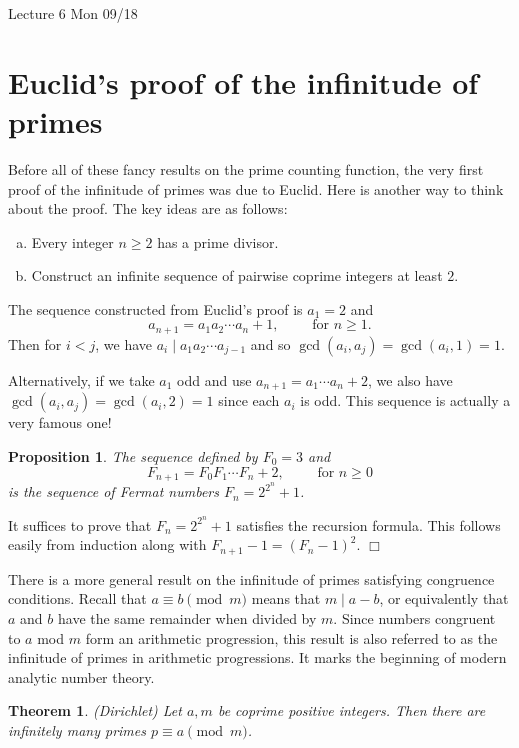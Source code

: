 \documentclass{article}
\newtheorem{theorem}[subsection]{Theorem}
\newtheorem{proposition}[subsection]{Proposition}
\newenvironment{proof}{\noindent {\bf Proof:}}{$\Box$ \vspace{2 ex}}
\newcommand{\add}[1]{{\color{blue} #1}}
\begin{document}
\begin{center}
    \add{Lecture 6 Mon 09/18}
\end{center}
\section{Euclid's proof of the infinitude of primes}

Before all of these fancy results on the prime counting function, the very first proof of the infinitude of primes was due to Euclid. Here is another way to think about the proof. The key ideas are as follows:
\begin{enumerate}[(a)]
    \item Every integer $n\geq 2$ has a prime divisor.
    \item Construct an infinite sequence of pairwise coprime integers at least $2$.
\end{enumerate}
The sequence constructed from Euclid's proof is $a_1 = 2$ and 
$$a_{n+1} = a_1a_2\cdots a_n + 1,\qquad\mbox{ for }n\geq1.$$
Then for $i < j$, we have $a_i\mid a_1a_2\cdots a_{j-1}$ and so $\gcd(a_i,a_j) = \gcd(a_i, 1) = 1.$

\vspace{5pt}
Alternatively, if we take $a_1$ odd and use $a_{n+1} = a_1\cdots a_n + 2$, we also have $\gcd(a_i,a_j) = \gcd(a_i,2) = 1$ since each $a_i$ is odd. This sequence is actually a very famous one!

\begin{proposition}
    The sequence defined by $F_0 = 3$ and $$F_{n+1} = F_0F_1\cdots F_n + 2,\qquad\mbox{ for }n\geq 0$$
    is the sequence of Fermat numbers $F_n = 2^{2^n}+1$.
\end{proposition}

\begin{proof}
    It suffices to prove that $F_n = 2^{2^n}+1$ satisfies the recursion formula. This follows easily from induction along with $F_{n+1} - 1 = (F_n - 1)^2$.
\end{proof}

There is a more general result on the infinitude of primes satisfying congruence conditions. Recall that $a\equiv b\pmod{m}$ means that $m\mid a - b$, or equivalently that $a$ and $b$ have the same remainder when divided by $m$. Since numbers congruent to $a$ mod $m$ form an arithmetic progression, this result is also referred to as the infinitude of primes in arithmetic progressions. It marks the beginning of modern analytic number theory.

\begin{theorem}
    (Dirichlet) Let $a,m$ be coprime positive integers. Then there are infinitely many primes $p\equiv a\pmod{m}$.
\end{theorem}
\end{document}
